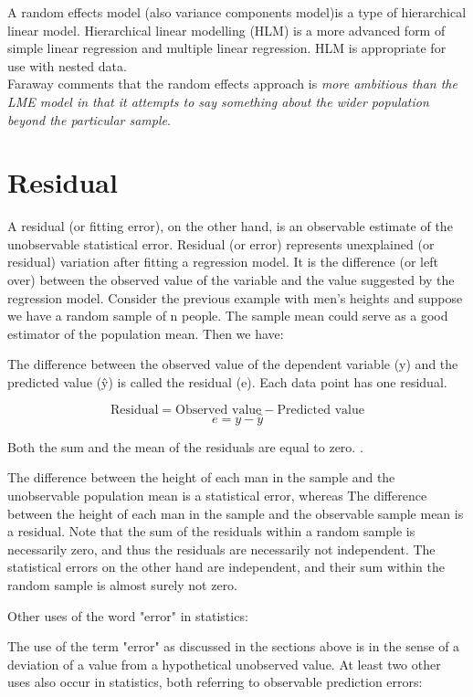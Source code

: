 \documentclass[12pt, a4paper]{report}
\theoremstyle{plain}
\theoremstyle{definition}
\theoremstyle{remark}
\begin{document}
A random effects model (also variance components model)is a type
of hierarchical linear model. Hierarchical linear modelling (HLM)
is a more advanced form of simple linear regression and multiple
linear regression. HLM is appropriate for use with nested
data.\\Faraway comments that the random effects approach is
\emph{more ambitious than the LME model in that it attempts to say
	something about the wider population beyond the particular
	sample}.
	
	\section{Residual}
	
	A residual (or fitting error), on the other hand, is an observable estimate of the unobservable statistical error.
	Residual (or error) represents unexplained (or residual) variation after fitting a regression model. It is the difference (or left over) between the observed value of the variable and the value suggested by the regression model.
	Consider the previous example with men's heights and suppose we have a random sample of n people. The sample mean could serve as a good estimator of the population mean. Then we have:
	
	
	The difference between the observed value of the dependent variable (y) and the predicted value (ŷ) is called the residual (e). Each data point has one residual.
	
	\[ \mbox{Residual} = \mbox{Observed value} - \mbox{Predicted value}\]
	\[e = y - \hat{y} \]
	
	Both the sum and the mean of the residuals are equal to zero. .
	
	
	
	The difference between the height of each man in the sample and the unobservable population mean is a statistical error, whereas
	The difference between the height of each man in the sample and the observable sample mean is a residual.
	Note that the sum of the residuals within a random sample is necessarily zero, and thus the residuals are necessarily not independent. The statistical errors on the other hand are independent, and their sum within the random sample is almost surely not zero.
	
	
	Other uses of the word "error" in statistics: 
	
	The use of the term "error" as discussed in the sections above is in the sense of a deviation of a value from a hypothetical unobserved value. At least two other uses also occur in statistics, both referring to observable prediction errors:
	
\end{document}
